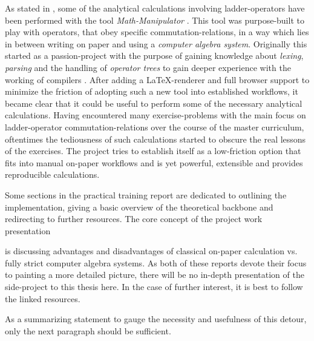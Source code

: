 As stated in , some of the analytical calculations involving ladder-operators have been performed with the tool \emph{Math-Manipulator} \cite{selfMathManipulator}.
This tool was purpose-built to play with operators, that obey specific commutation-relations, in a way which lies in between writing on paper and using a \emph{computer algebra system}.
Originally this started as a passion-project with the purpose of gaining knowledge about \emph{lexing}, \emph{parsing} and the handling of \emph{operator trees} to gain deeper experience with the working of compilers \cite{compilersDragonBook}.
After adding a \LaTeX-renderer and full browser support to minimize the friction of adopting such a new tool into established workflows, it became clear that it could be useful to perform some of the necessary analytical calculations.
Having encountered many exercise-problems with the main focus on ladder-operator commutation-relations over the course of the master curriculum, oftentimes the tediousness of such calculations started to obscure the real lessons of the exercises.
The project tries to establish itself as a low-friction option that fits into manual \glqq on-paper\grqq{} workflows and is yet powerful, extensible and provides reproducible calculations.

Some sections in the practical training report  are dedicated to outlining the implementation, giving a basic overview of the theoretical backbone and redirecting to further resources.
The core concept of the project work presentation 

 is discussing advantages and disadvantages of classical \glqq on-paper\grqq{} calculation vs. fully strict computer algebra systems.
As both of these reports devote their focus to painting a more detailed picture, there will be no in-depth presentation of the side-project to this thesis here.
In the case of further interest, it is best to follow the linked resources.

As a summarizing statement to gauge the necessity and usefulness of this detour, only the next paragraph should be sufficient.

